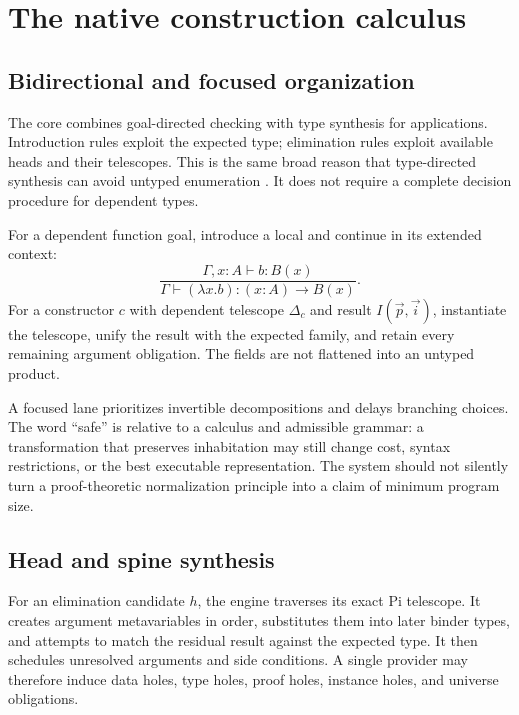 \section{The native construction calculus}
\label{sec:construction}

\subsection{Bidirectional and focused organization}

The core combines goal-directed checking with type synthesis for applications. Introduction rules exploit the expected type; elimination rules exploit available heads and their telescopes. This is the same broad reason that type-directed synthesis can avoid untyped enumeration \cite{osera,frankle}. It does not require a complete decision procedure for dependent types.

For a dependent function goal, introduce a local and continue in its extended context:
\[
 \frac{\Gamma,x:A\vdash b:B(x)}
      {\Gamma\vdash (\lambda x.b):(x:A)\to B(x)}.
\]
For a constructor $c$ with dependent telescope $\Delta_c$ and result $I(\vec p,\vec i)$, instantiate the telescope, unify the result with the expected family, and retain every remaining argument obligation. The fields are not flattened into an untyped product.

A focused lane prioritizes invertible decompositions and delays branching choices. The word ``safe'' is relative to a calculus and admissible grammar: a transformation that preserves inhabitation may still change cost, syntax restrictions, or the best executable representation. The system should not silently turn a proof-theoretic normalization principle into a claim of minimum program size.

\subsection{Head and spine synthesis}

For an elimination candidate $h$, the engine traverses its exact Pi telescope. It creates argument metavariables in order, substitutes them into later binder types, and attempts to match the residual result against the expected type. It then schedules unresolved arguments and side conditions. A single provider may therefore induce data holes, type holes, proof holes, instance holes, and universe obligations.

